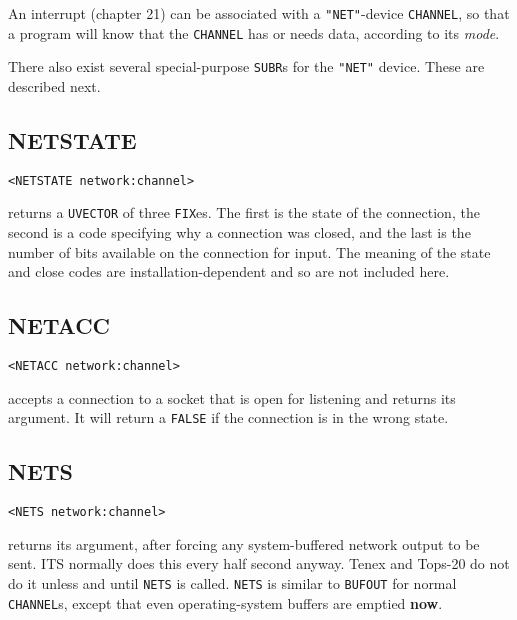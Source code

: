 \documentclass[a4paper]{scrbook}
\begin{document}
An interrupt (chapter 21) can be associated with a \texttt{"NET"}-device \texttt{CHANNEL}, so that a program will know that
the \texttt{CHANNEL} has or needs data, according to its \emph{mode}.

There also exist several special-purpose \texttt{SUBR}s for the \texttt{"NET"} device. These are described next.

\subsection{NETSTATE}\label{netstate}

\begin{verbatim}
<NETSTATE network:channel>
\end{verbatim}

 returns a \texttt{UVECTOR} of three \texttt{FIX}es. The first is the state of the
connection, the second is a code specifying why a connection was closed, and the last is the number of bits available on
the connection for input. The meaning of the state and close codes are installation-dependent and so are not included here.

\subsection{NETACC}\label{netacc}

\begin{verbatim}
<NETACC network:channel>
\end{verbatim}

 accepts a connection to a socket that is open for listening and returns its argument. It
will return a \texttt{FALSE} if the connection is in the wrong state.

\subsection{NETS}\label{nets}

\begin{verbatim}
<NETS network:channel>
\end{verbatim}

 returns its argument, after forcing any system-buffered network output to be sent. ITS
 normally does this every half second anyway. Tenex  and Tops-20
 do not do it unless and until \texttt{NETS} is called. \texttt{NETS} is similar to \texttt{BUFOUT}
 for normal \texttt{CHANNEL}s, except that even operating-system buffers are emptied \textbf{now}.
\end{document}
